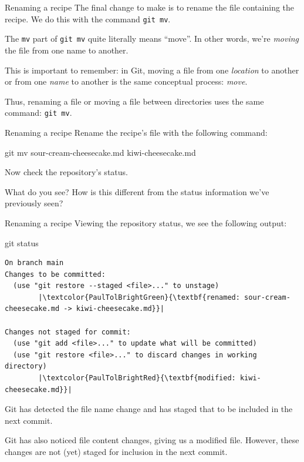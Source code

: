 \begin{frame}[fragile]{Renaming a recipe}
    The final change to make is to rename the file containing the recipe.
    We do this with the command \texttt{git mv}.

    The \texttt{mv} part of \texttt{git mv} quite
    literally means ``move''.  In other words, we're \emph{moving} the file
    from one name to another.

    This is important to remember: in Git, moving a file from one
    \emph{location} to another or from one \emph{name} to another is the
    same conceptual process: \emph{move}.

    Thus, renaming a file or moving a file between directories uses the same
    command: \texttt{git mv}.
\end{frame}

\begin{frame}[fragile]{Renaming a recipe}
    Rename the recipe's file with the following command:
    \begin{shellcode}
        git mv sour-cream-cheesecake.md kiwi-cheesecake.md
    \end{shellcode}

    Now check the repository's status.

    What do you see?  How is this different from the status information
    we've previously seen?
\end{frame}

\begin{frame}[fragile]{Renaming a recipe}
    Viewing the repository status, we see the following output:
    \begin{shellcode}
        git status
    \end{shellcode}
    \begin{verbatim}
On branch main
Changes to be committed:
  (use "git restore --staged <file>..." to unstage)
        |\textcolor{PaulTolBrightGreen}{\textbf{renamed: sour-cream-cheesecake.md -> kiwi-cheesecake.md}}|

Changes not staged for commit:
  (use "git add <file>..." to update what will be committed)
  (use "git restore <file>..." to discard changes in working directory)
        |\textcolor{PaulTolBrightRed}{\textbf{modified: kiwi-cheesecake.md}}|
    \end{verbatim}

    Git has detected the file name change and has staged that to be included
    in the next commit.

    Git has also noticed file content changes, giving us a modified file.
    However, these changes are not (yet) staged for inclusion in the next
    commit.
\end{frame}


